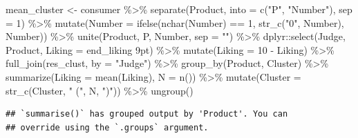 \documentclass[
]{krantz}
\makeatletter
\newenvironment{Shaded}{\begin{snugshade}}{\end{snugshade}}
\newcommand{\AttributeTok}[1]{\textcolor[rgb]{0.61,0.61,0.61}{#1}}
\newcommand{\DecValTok}[1]{\textcolor[rgb]{0.06,0.06,0.06}{#1}}
\newcommand{\FunctionTok}[1]{\textcolor[rgb]{0,0,0}{#1}}
\newcommand{\NormalTok}[1]{#1}
\newcommand{\OtherTok}[1]{\textcolor[rgb]{0.37,0.37,0.37}{#1}}
\newcommand{\SpecialCharTok}[1]{\textcolor[rgb]{0,0,0}{#1}}
\newcommand{\StringTok}[1]{\textcolor[rgb]{0.5,0.5,0.5}{#1}}
\newenvironment{kframe}{%
\medskip{}
\setlength{\fboxsep}{.8em}
 \def\at@end@of@kframe{}%
 \ifinner\ifhmode%
  \def\at@end@of@kframe{\end{minipage}}%
  \begin{minipage}{\columnwidth}%
 \fi\fi%
 \def\FrameCommand##1{\hskip\@totalleftmargin \hskip-\fboxsep
 \colorbox{shadecolor}{##1}\hskip-\fboxsep
     \hskip-\linewidth \hskip-\@totalleftmargin \hskip\columnwidth}%
 \MakeFramed {\advance\hsize-\width
   \@totalleftmargin\z@ \linewidth\hsize
   \@setminipage}}%
 {\par\unskip\endMakeFramed%
 \at@end@of@kframe}
\renewenvironment{Shaded}{\begin{kframe}}{\end{kframe}}
\makeatother
\begin{document}
\begin{Shaded}
\begin{Highlighting}[]
\NormalTok{mean\_cluster }\OtherTok{\textless{}{-}}\NormalTok{ consumer }\SpecialCharTok{\%\textgreater{}\%}
  \FunctionTok{separate}\NormalTok{(Product, }\AttributeTok{into =} \FunctionTok{c}\NormalTok{(}\StringTok{"P"}\NormalTok{, }\StringTok{"Number"}\NormalTok{), }\AttributeTok{sep =} \DecValTok{1}\NormalTok{) }\SpecialCharTok{\%\textgreater{}\%}
  \FunctionTok{mutate}\NormalTok{(}\AttributeTok{Number =} \FunctionTok{ifelse}\NormalTok{(}\FunctionTok{nchar}\NormalTok{(Number) }\SpecialCharTok{==} \DecValTok{1}\NormalTok{, }\FunctionTok{str\_c}\NormalTok{(}\StringTok{"0"}\NormalTok{, Number), Number)) }\SpecialCharTok{\%\textgreater{}\%}
  \FunctionTok{unite}\NormalTok{(Product, P, Number, }\AttributeTok{sep =} \StringTok{""}\NormalTok{) }\SpecialCharTok{\%\textgreater{}\%}
\NormalTok{  dplyr}\SpecialCharTok{::}\FunctionTok{select}\NormalTok{(Judge, Product, }\AttributeTok{Liking =} \StringTok{\textasciigrave{}}\AttributeTok{end\_liking 9pt}\StringTok{\textasciigrave{}}\NormalTok{) }\SpecialCharTok{\%\textgreater{}\%}
  \FunctionTok{mutate}\NormalTok{(}\AttributeTok{Liking =} \DecValTok{10} \SpecialCharTok{{-}}\NormalTok{ Liking) }\SpecialCharTok{\%\textgreater{}\%}
  \FunctionTok{full\_join}\NormalTok{(res\_clust, }\AttributeTok{by =} \StringTok{"Judge"}\NormalTok{) }\SpecialCharTok{\%\textgreater{}\%}
  \FunctionTok{group\_by}\NormalTok{(Product, Cluster) }\SpecialCharTok{\%\textgreater{}\%}
  \FunctionTok{summarize}\NormalTok{(}\AttributeTok{Liking =} \FunctionTok{mean}\NormalTok{(Liking), }\AttributeTok{N =} \FunctionTok{n}\NormalTok{()) }\SpecialCharTok{\%\textgreater{}\%}
  \FunctionTok{mutate}\NormalTok{(}\AttributeTok{Cluster =} \FunctionTok{str\_c}\NormalTok{(Cluster, }\StringTok{" ("}\NormalTok{, N, }\StringTok{")"}\NormalTok{)) }\SpecialCharTok{\%\textgreater{}\%}
  \FunctionTok{ungroup}\NormalTok{()}
\end{Highlighting}
\end{Shaded}

\begin{verbatim}
## `summarise()` has grouped output by 'Product'. You can
## override using the `.groups` argument.
\end{verbatim}
\end{document}
